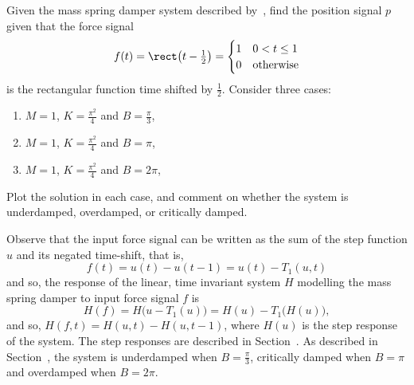 \begin{excersizelist}
\item \label{exer:massspringdamperrect} Given the mass spring damper system described by~, find the position signal $p$ given that the force signal 
\[
f(t) = \rect\big(t-\tfrac{1}{2}\big) = \begin{cases}
1 & 0 < t \leq 1 \\
0 & \text{otherwise}
\end{cases}
\]
is the rectangular function time shifted by $\tfrac{1}{2}$.  Consider three cases:
\begin{enumerate}
\item $M=1$, $K=\tfrac{\pi^2}{4}$ and $B=\tfrac{\pi}{3}$,
\item $M=1$, $K=\tfrac{\pi^2}{4}$ and $B=\pi$,
\item $M=1$, $K=\tfrac{\pi^2}{4}$ and $B=2\pi$,
\end{enumerate}
Plot the solution in each case, and comment on whether the system is underdamped, overdamped, or critically damped. 
\begin{solution}
Observe that the input force signal can be written as the sum of the step function $u$ and its negated time-shift, that is,
\[
f(t) = u(t) - u(t - 1) = u(t) - T_{1}(u,t)
\]
and so, the response of the linear, time invariant system $H$ modelling the mass spring damper to input force signal $f$ is
\[
H(f) = H\big(u - T_{1}(u)\big) = H(u) - T_{1}\big(H(u)\big),
\]
and so, $H(f,t) = H(u,t) - H(u,t-1)$, where $H(u)$ is the step response of the system.  The step responses are described in Section~.  As described in Section~, the system is underdamped when $B = \tfrac{\pi}{3}$, critically damped when $B = \pi$ and overdamped when $B = 2\pi$.
\end{solution}


\end{excersizelist}
